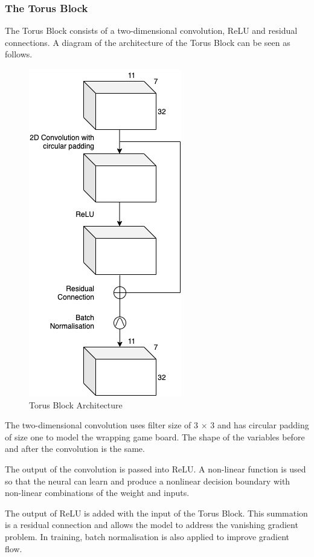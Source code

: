 
\subsubsection{The Torus Block}

The Torus Block consists of a two-dimensional convolution, ReLU and residual connections. A diagram of the architecture of the Torus Block can be seen as follows.

\begin{figure}[h!]
\centering
  \includegraphics[width=0.4\linewidth]{images/torusblock-edit.png}
  \caption{Torus Block Architecture}
\end{figure}

The two-dimensional convolution uses filter size of 3 $\times$ 3 and has circular padding of size one to model the wrapping game board. The shape of the variables before and after the convolution is the same.

The output of the convolution is passed into ReLU. A non-linear function is used so that the neural can learn and produce a nonlinear decision boundary with non-linear combinations of the weight and inputs.

The output of ReLU is added with the input of the Torus Block. This summation is a residual connection and allows the model to address the vanishing gradient problem. In training, batch normalisation is also applied to improve gradient flow.

